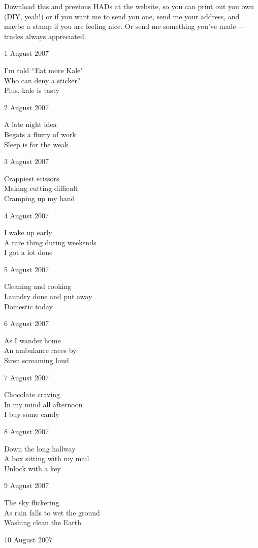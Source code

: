 \documentclass[12pt]{article}
\begin{document}
Download this and previous HADs at the website, so you can
print out you own (DIY, yeah!) or if you want me to send
you one, send me your address, and maybe a stamp if you
are feeling nice. Or send me something you've made ---
trades always appreciated.


1 August 2007

I'm told ``Eat more Kale" \\
Who can deny a sticker? \\
Plus, kale is tasty

2 August 2007

A late night idea \\
Begats a flurry of work \\
Sleep is for the weak 

3 August 2007

Crappiest scissors \\
Making cutting difficult \\
Cramping up my hand

\newpage

4 August 2007

I wake up early \\
A rare thing during weekends \\
I got a lot done


5 August 2007

Cleaning and cooking \\
Laundry done and put away \\
Domestic today

6 August 2007

As I wander home \\
An ambulance races by \\
Siren screaming loud

7 August 2007

Chocolate craving \\
In my mind all afternoon \\
I buy some candy

8 August 2007

Down the long hallway \\
A box sitting with my mail \\
Unlock with a key

9 August 2007

The sky flickering \\
As rain falls to wet the ground \\
Washing clean the Earth

10 August 2007
\end{document}
